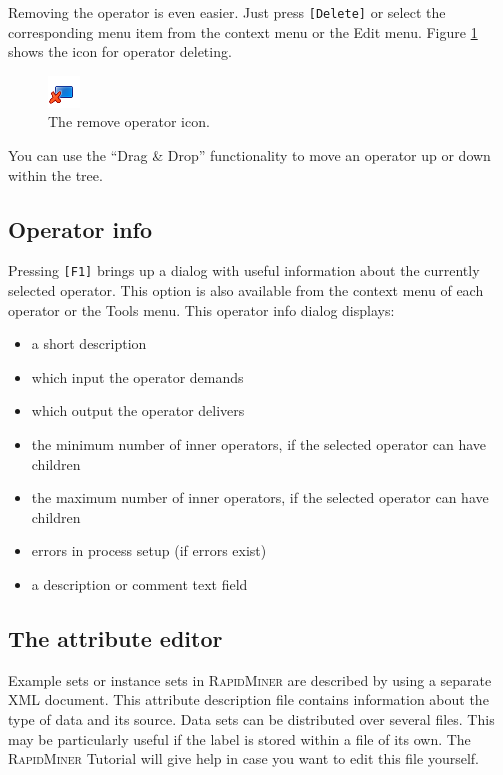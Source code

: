 \documentclass[11pt]{article}
\newcommand{\key}[1]{\texttt{[#1]}}
\newcommand{\useroption}[1]{\textsf{#1}}
\newcommand{\rapidminer}{\protect \textsc{RapidMiner}\xspace}
\begin{document}
\medskip


Removing the operator is even easier. Just press
\key{Delete} or select the corresponding menu item from the context
menu or the \useroption{Edit} menu. Figure \ref{fig:operator_delete}
shows the icon for operator deleting.
\begin{figure}[ht]
\center
\includegraphics[width=0.08\linewidth]{delete_operator.png}
\caption{The remove operator icon.}
\label{fig:operator_delete}
\end{figure}

You can use the ``Drag \& Drop'' functionality
to move an operator up or down within the tree.






\subsection{Operator info}

Pressing \key{F1} brings up a dialog with useful information about
the currently selected operator. This option is also available from
the context menu of each operator or the \useroption{Tools} menu. This
operator info dialog displays:
\begin{itemize}
\item a short description
\item which input the operator demands
\item which output the operator delivers
\item the minimum number of inner operators, if the selected operator
  can have children
\item the maximum number of inner operators, if the selected operator
  can have children
\item errors in process setup (if errors exist)
\item a description or comment text field
\end{itemize}





\subsection{The attribute editor}
\label{sec:attribute_editor}

Example sets or instance sets in \rapidminer are described by using a separate XML
document. This attribute description file contains information about
the type of data and its source. Data sets can be distributed over
several files. This may be particularly useful if the label is stored
within a file of its own. The \rapidminer Tutorial will give help in case you
want to edit this file yourself.
\end{document}
